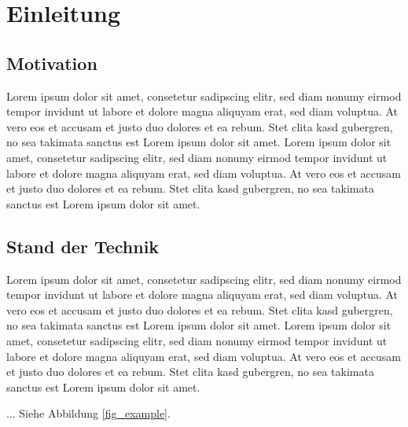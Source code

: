 \chapter{Einleitung}

\section{Motivation}
Lorem ipsum dolor sit amet, consetetur sadipscing elitr, sed diam nonumy eirmod tempor invidunt ut labore et dolore magna aliquyam erat, sed diam voluptua. At vero eos et accusam et justo duo dolores et ea rebum. Stet clita kasd gubergren, no sea takimata sanctus est Lorem ipsum dolor sit amet. Lorem ipsum dolor sit amet, consetetur sadipscing elitr, sed diam nonumy eirmod tempor invidunt ut labore et dolore magna aliquyam erat, sed diam voluptua. At vero eos et accusam et justo duo dolores et ea rebum. Stet clita kasd gubergren, no sea takimata sanctus est Lorem ipsum dolor sit amet.

\section{Stand der Technik}
Lorem ipsum dolor sit amet, consetetur sadipscing elitr, sed diam nonumy eirmod tempor invidunt ut labore et dolore magna aliquyam erat, sed diam voluptua. At vero eos et accusam et justo duo dolores et ea rebum. Stet clita kasd gubergren, no sea takimata sanctus est Lorem ipsum dolor sit amet. Lorem ipsum dolor sit amet, consetetur sadipscing elitr, sed diam nonumy eirmod tempor invidunt ut labore et dolore magna aliquyam erat, sed diam voluptua. At vero eos et accusam et justo duo dolores et ea rebum. Stet clita kasd gubergren, no sea takimata sanctus est Lorem ipsum dolor sit amet.

... Siehe Abbildung \ref{fig_example}.

